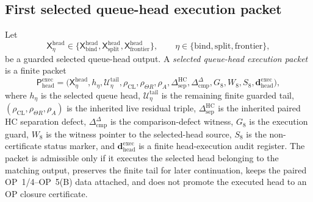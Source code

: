 \subsection{First selected queue-head execution packet}
\label{subsec:first-selected-queue-head-execution-packet}

\begin{definition}
\label{def:selected-queue-head-execution-packet}
Let
\[
 \mathsf X_{\eta}^{\mathrm{head}}
 \in
 \{\mathsf X_{\mathrm{bind}}^{\mathrm{head}},
 \mathsf X_{\mathrm{split}}^{\mathrm{head}},
 \mathsf X_{\mathrm{frontier}}^{\mathrm{head}}\},
 \qquad
 \eta\in\{\mathrm{bind},\mathrm{split},\mathrm{frontier}\},
\]
be a guarded selected queue-head output. A \emph{selected queue-head execution packet} is a finite packet
\[
 \mathsf P_{\mathrm{head}}^{\mathrm{exec}}
 =
 \bigl(
 \mathsf X_{\eta}^{\mathrm{head}},
 h_{\eta},
 \mathcal U_{\eta}^{\mathrm{tail}},
 \rho_{\mathrm{CL}},\rho_{\Theta R},\rho_A,
 \Delta_{\mathrm{sep}}^{\mathrm{HC}},
 \Delta_{\mathrm{cmp}}^{\Delta},
 G_8,W_8,S_8,
 \mathbf d_{\mathrm{head}}^{\mathrm{exec}}
 \bigr),
\]
where \(h_{\eta}\) is the selected queue head, \(\mathcal U_{\eta}^{\mathrm{tail}}\) is the remaining finite guarded tail, \((\rho_{\mathrm{CL}},\rho_{\Theta R},\rho_A)\) is the inherited live residual triple, \(\Delta_{\mathrm{sep}}^{\mathrm{HC}}\) is the inherited paired HC separation defect, \(\Delta_{\mathrm{cmp}}^{\Delta}\) is the comparison-defect witness, \(G_8\) is the execution guard, \(W_8\) is the witness pointer to the selected-head source, \(S_8\) is the non-certificate status marker, and \(\mathbf d_{\mathrm{head}}^{\mathrm{exec}}\) is a finite head-execution audit register. The packet is admissible only if it executes the selected head belonging to the matching output, preserves the finite tail for later continuation, keeps the paired OP~1/4--OP~5(B) data attached, and does not promote the executed head to an OP closure certificate.
\end{definition}

